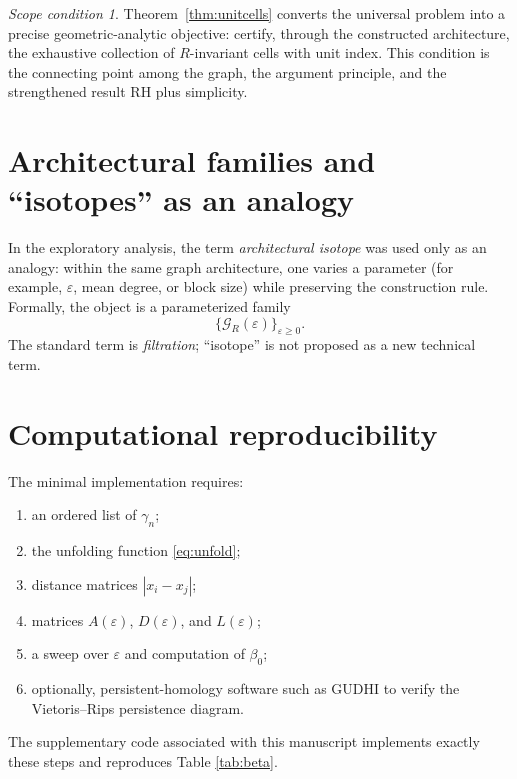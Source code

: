\documentclass[11pt]{amsart}
\theoremstyle{definition}
\theoremstyle{remark}
\newtheorem{scope}[theorem]{Scope condition}
\begin{document}
\begin{scope}
Theorem~\ref{thm:unitcells} converts the universal problem into a precise geometric-analytic objective: certify, through the constructed architecture, the exhaustive collection of $R$-invariant cells with unit index. This condition is the connecting point among the graph, the argument principle, and the strengthened result RH plus simplicity.
\end{scope}

\section{Architectural families and ``isotopes'' as an analogy}
In the exploratory analysis, the term \emph{architectural isotope} was used only as an analogy: within the same graph architecture, one varies a parameter (for example, $\varepsilon$, mean degree, or block size) while preserving the construction rule. Formally, the object is a parameterized family
\begin{equation}
 \{\mathcal G_R(\varepsilon)\}_{\varepsilon\ge0}.
\end{equation}
The standard term is \emph{filtration}; ``isotope'' is not proposed as a new technical term.

\section{Computational reproducibility}
The minimal implementation requires:
\begin{enumerate}
\item an ordered list of $\gamma_n$;
\item the unfolding function \eqref{eq:unfold};
\item distance matrices $|x_i-x_j|$;
\item matrices $A(\varepsilon)$, $D(\varepsilon)$, and $L(\varepsilon)$;
\item a sweep over $\varepsilon$ and computation of $\beta_0$;
\item optionally, persistent-homology software such as GUDHI to verify the Vietoris--Rips persistence diagram.
\end{enumerate}
The supplementary code associated with this manuscript implements exactly these steps and reproduces Table \ref{tab:beta}.
\end{document}
